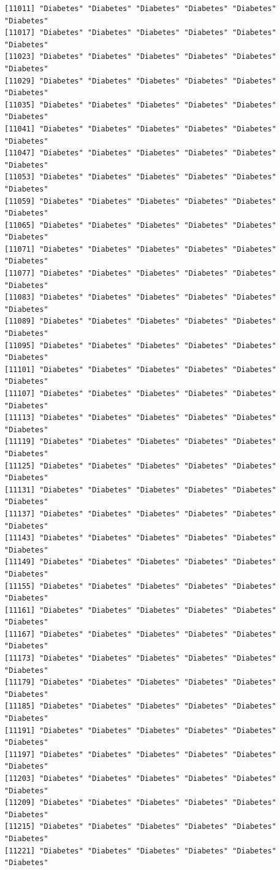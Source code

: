 \documentclass[
  letterpaper,
  DIV=11,
  numbers=noendperiod]{scrartcl}
\begin{document}
\begin{verbatim}
[11011] "Diabetes" "Diabetes" "Diabetes" "Diabetes" "Diabetes" "Diabetes"
[11017] "Diabetes" "Diabetes" "Diabetes" "Diabetes" "Diabetes" "Diabetes"
[11023] "Diabetes" "Diabetes" "Diabetes" "Diabetes" "Diabetes" "Diabetes"
[11029] "Diabetes" "Diabetes" "Diabetes" "Diabetes" "Diabetes" "Diabetes"
[11035] "Diabetes" "Diabetes" "Diabetes" "Diabetes" "Diabetes" "Diabetes"
[11041] "Diabetes" "Diabetes" "Diabetes" "Diabetes" "Diabetes" "Diabetes"
[11047] "Diabetes" "Diabetes" "Diabetes" "Diabetes" "Diabetes" "Diabetes"
[11053] "Diabetes" "Diabetes" "Diabetes" "Diabetes" "Diabetes" "Diabetes"
[11059] "Diabetes" "Diabetes" "Diabetes" "Diabetes" "Diabetes" "Diabetes"
[11065] "Diabetes" "Diabetes" "Diabetes" "Diabetes" "Diabetes" "Diabetes"
[11071] "Diabetes" "Diabetes" "Diabetes" "Diabetes" "Diabetes" "Diabetes"
[11077] "Diabetes" "Diabetes" "Diabetes" "Diabetes" "Diabetes" "Diabetes"
[11083] "Diabetes" "Diabetes" "Diabetes" "Diabetes" "Diabetes" "Diabetes"
[11089] "Diabetes" "Diabetes" "Diabetes" "Diabetes" "Diabetes" "Diabetes"
[11095] "Diabetes" "Diabetes" "Diabetes" "Diabetes" "Diabetes" "Diabetes"
[11101] "Diabetes" "Diabetes" "Diabetes" "Diabetes" "Diabetes" "Diabetes"
[11107] "Diabetes" "Diabetes" "Diabetes" "Diabetes" "Diabetes" "Diabetes"
[11113] "Diabetes" "Diabetes" "Diabetes" "Diabetes" "Diabetes" "Diabetes"
[11119] "Diabetes" "Diabetes" "Diabetes" "Diabetes" "Diabetes" "Diabetes"
[11125] "Diabetes" "Diabetes" "Diabetes" "Diabetes" "Diabetes" "Diabetes"
[11131] "Diabetes" "Diabetes" "Diabetes" "Diabetes" "Diabetes" "Diabetes"
[11137] "Diabetes" "Diabetes" "Diabetes" "Diabetes" "Diabetes" "Diabetes"
[11143] "Diabetes" "Diabetes" "Diabetes" "Diabetes" "Diabetes" "Diabetes"
[11149] "Diabetes" "Diabetes" "Diabetes" "Diabetes" "Diabetes" "Diabetes"
[11155] "Diabetes" "Diabetes" "Diabetes" "Diabetes" "Diabetes" "Diabetes"
[11161] "Diabetes" "Diabetes" "Diabetes" "Diabetes" "Diabetes" "Diabetes"
[11167] "Diabetes" "Diabetes" "Diabetes" "Diabetes" "Diabetes" "Diabetes"
[11173] "Diabetes" "Diabetes" "Diabetes" "Diabetes" "Diabetes" "Diabetes"
[11179] "Diabetes" "Diabetes" "Diabetes" "Diabetes" "Diabetes" "Diabetes"
[11185] "Diabetes" "Diabetes" "Diabetes" "Diabetes" "Diabetes" "Diabetes"
[11191] "Diabetes" "Diabetes" "Diabetes" "Diabetes" "Diabetes" "Diabetes"
[11197] "Diabetes" "Diabetes" "Diabetes" "Diabetes" "Diabetes" "Diabetes"
[11203] "Diabetes" "Diabetes" "Diabetes" "Diabetes" "Diabetes" "Diabetes"
[11209] "Diabetes" "Diabetes" "Diabetes" "Diabetes" "Diabetes" "Diabetes"
[11215] "Diabetes" "Diabetes" "Diabetes" "Diabetes" "Diabetes" "Diabetes"
[11221] "Diabetes" "Diabetes" "Diabetes" "Diabetes" "Diabetes" "Diabetes"

\end{verbatim}
\end{document}

